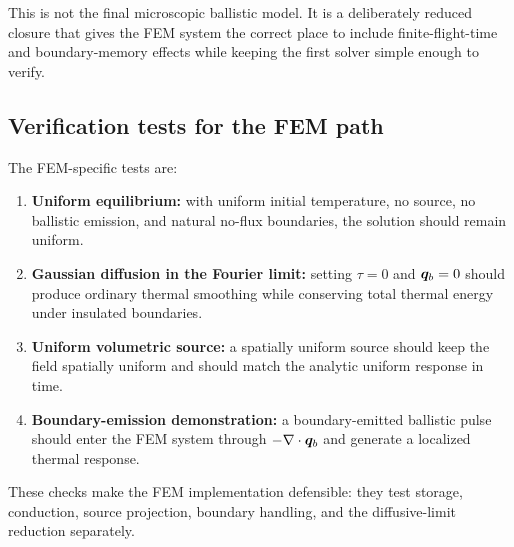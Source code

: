 \documentclass[11pt]{article}
\begin{document}
This is not the final microscopic ballistic model. It is a deliberately reduced closure that gives the FEM system the correct place to include finite-flight-time and boundary-memory effects while keeping the first solver simple enough to verify.

\subsection{Verification tests for the FEM path}
The FEM-specific tests are:
\begin{enumerate}[leftmargin=1.6em]
    \item \textbf{Uniform equilibrium:} with uniform initial temperature, no source, no ballistic emission, and natural no-flux boundaries, the solution should remain uniform.
    \item \textbf{Gaussian diffusion in the Fourier limit:} setting \(\tau=0\) and \(\bm{q}_b=0\) should produce ordinary thermal smoothing while conserving total thermal energy under insulated boundaries.
    \item \textbf{Uniform volumetric source:} a spatially uniform source should keep the field spatially uniform and should match the analytic uniform response in time.
    \item \textbf{Boundary-emission demonstration:} a boundary-emitted ballistic pulse should enter the FEM system through \(-\nabla\cdot\bm{q}_b\) and generate a localized thermal response.
\end{enumerate}
These checks make the FEM implementation defensible: they test storage, conduction, source projection, boundary handling, and the diffusive-limit reduction separately.
\end{document}
